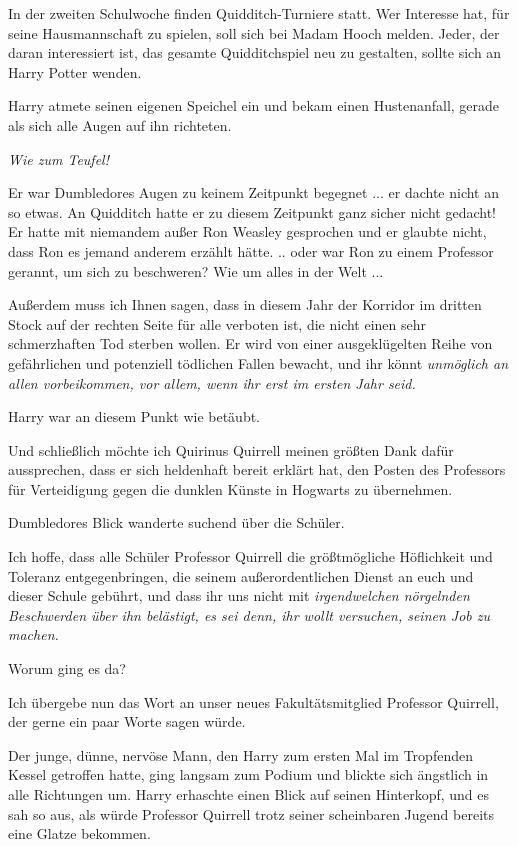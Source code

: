 \glqq{}In der zweiten Schulwoche finden Quidditch-Turniere statt. Wer Interesse
hat, für seine Hausmannschaft zu spielen, soll sich bei Madam Hooch melden.
Jeder, der daran interessiert ist, das gesamte Quidditchspiel neu zu gestalten,
sollte sich an Harry Potter wenden.\grqq{}

Harry atmete seinen eigenen Speichel ein und bekam einen Hustenanfall, gerade
als sich alle Augen auf ihn richteten.

\emph{Wie zum Teufel!}

Er war Dumbledores Augen zu keinem Zeitpunkt begegnet ... er dachte nicht an so
etwas. An Quidditch hatte er zu diesem Zeitpunkt ganz sicher nicht gedacht! Er
hatte mit niemandem außer Ron Weasley gesprochen und er glaubte nicht, dass Ron
es jemand anderem erzählt hätte. .. oder war Ron zu einem Professor gerannt, um
sich zu beschweren? Wie um alles in der Welt ...

\glqq{}Außerdem muss ich Ihnen sagen, dass in diesem Jahr der Korridor im
dritten Stock auf der rechten Seite für alle verboten ist, die nicht einen sehr
schmerzhaften Tod sterben wollen. Er wird von einer ausgeklügelten Reihe von
gefährlichen und potenziell tödlichen Fallen bewacht, und ihr könnt
\emph{unmöglich an allen vorbeikommen, vor allem, wenn ihr erst im ersten Jahr
seid.}\grqq{}

Harry war an diesem Punkt wie betäubt.

\glqq{}Und schließlich möchte ich Quirinus Quirrell meinen größten Dank dafür
aussprechen, dass er sich heldenhaft bereit erklärt hat, den Posten des
Professors für Verteidigung gegen die dunklen Künste in Hogwarts zu
übernehmen.\grqq{}

Dumbledores Blick wanderte suchend über die Schüler.

\glqq{}Ich hoffe, dass alle Schüler Professor Quirrell die größtmögliche
Höflichkeit und Toleranz entgegenbringen, die seinem außerordentlichen Dienst an
euch und dieser Schule gebührt, und dass ihr uns nicht mit \emph{irgendwelchen
nörgelnden Beschwerden über ihn belästigt, es sei denn, ihr wollt versuchen,
seinen Job zu machen.}\grqq{}

Worum ging es da?

\glqq{}Ich übergebe nun das Wort an unser neues Fakultätsmitglied Professor
Quirrell, der gerne ein paar Worte sagen würde.\grqq{}

Der junge, dünne, nervöse Mann, den Harry zum ersten Mal im Tropfenden Kessel
getroffen hatte, ging langsam zum Podium und blickte sich ängstlich in alle
Richtungen um. Harry erhaschte einen Blick auf seinen Hinterkopf, und es sah so
aus, als würde Professor Quirrell trotz seiner scheinbaren Jugend bereits eine
Glatze bekommen.

